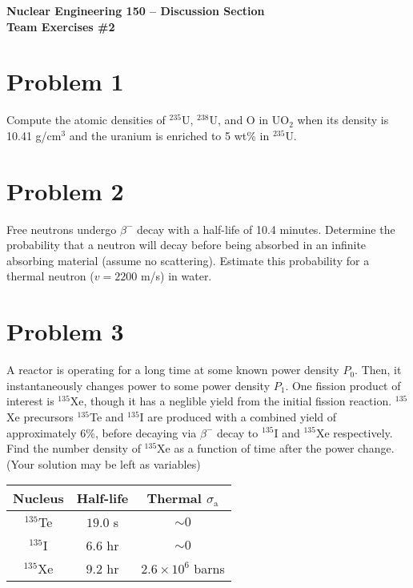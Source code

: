 \documentclass{report}
\begin{document}
\begin{center}
\textbf{\large Nuclear Engineering 150 -- Discussion Section}\\ 
\textbf{Team Exercises \#2}
\end{center}

\section*{Problem 1}

Compute the atomic densities of $^{235}$U, $^{238}$U, and O in UO$_2$ when its density is 10.41 g/cm$^3$ and the uranium is enriched to 5 wt\% in $^{235}$U.



\newpage
\section*{Problem 2}

Free neutrons undergo $\beta^{-}$ decay with a half-life of 10.4 minutes. Determine the probability that a neutron will decay before being absorbed in an infinite absorbing material (assume no scattering). Estimate this probability for a thermal neutron ($v = 2200$ m/s) in water.



\newpage
\section*{Problem 3}

A reactor is operating for a long time at some known power density $P_0$. Then, it instantaneously changes power to some power density $P_1$. One fission product of interest is $^{135}$Xe, though it has a neglible yield from the initial fission reaction. $^{135}$Xe precursors $^{135}$Te and $^{135}$I are produced with a combined yield of approximately 6\%, before decaying via $\beta^{-}$ decay to $^{135}$I and $^{135}$Xe respectively. Find the number density of $^{135}$Xe as a function of time after the power change. (Your solution may be left as variables)

\begin{table}[htbp]
	\centering
	\begin{tabular}{|c|c|c|}
			\hline
			Nucleus		&	Half-life 	& Thermal $\sigma_{\text{a}}$ \\
			\hline
			$^{135}$Te	&  $19.0$ s 	& $\sim 0$\\
			$^{135}$I	&  $6.6$ hr 	& $\sim 0$\\
			$^{135}$Xe	&  $9.2$ hr 	& $2.6 \times 10^6$ barns \\
			\hline
	\end{tabular}
	\label{tab:design-specs}
\end{table}
\end{document}
